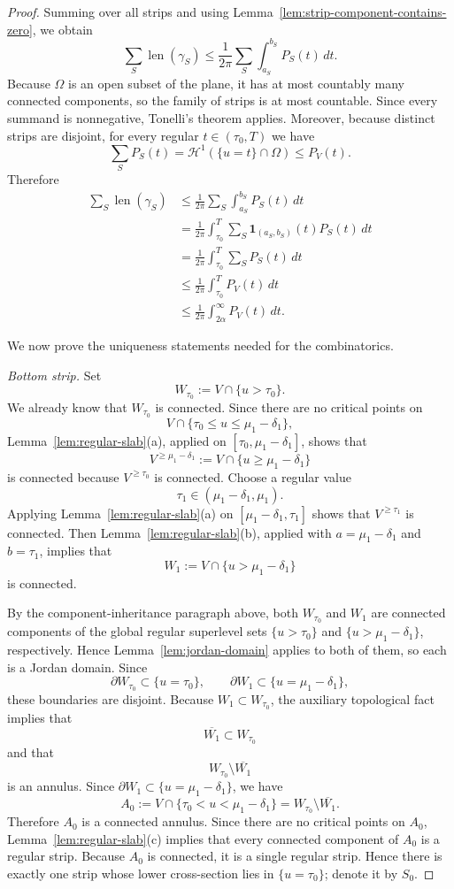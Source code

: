 \documentclass[12pt]{amsart}
\theoremstyle{definition}
\theoremstyle{remark}
\begin{document}
\begin{proof}
\indent Summing over all strips and using Lemma~\ref{lem:strip-component-contains-zero}, we obtain
\[
\sum_S \operatorname{len}(\gamma_S)\le \frac{1}{2\pi}\sum_S\int_{a_S}^{b_S} P_S(t)\,dt.
\]
Because $\Omega$ is an open subset of the plane, it has at most countably many connected components, so the family of strips is at most countable. Since every summand is nonnegative, Tonelli's theorem applies. Moreover, because distinct strips are disjoint, for every regular $t\in(\tau_0,T)$ we have
\[
\sum_S P_S(t)=\mathcal H^1(\{u=t\}\cap\Omega)\le P_V(t).
\]
Therefore
\begin{align}
\sum_S \operatorname{len}(\gamma_S)
&\le \frac{1}{2\pi}\sum_S\int_{a_S}^{b_S} P_S(t)\,dt \\
&= \frac{1}{2\pi}\int_{\tau_0}^{T}\sum_S \mathbf 1_{(a_S,b_S)}(t)P_S(t)\,dt \\
&= \frac{1}{2\pi}\int_{\tau_0}^{T}\sum_S P_S(t)\,dt \\
&\le \frac{1}{2\pi}\int_{\tau_0}^{T} P_V(t)\,dt \\
&\le \frac{1}{2\pi}\int_{2\alpha}^{\infty} P_V(t)\,dt.
\tag{11}
\end{align}

We now prove the uniqueness statements needed for the combinatorics.

\smallskip
\noindent\emph{Bottom strip.}
Set
\[
W_{\tau_0}:=V\cap\{u>\tau_0\}.
\]
We already know that $W_{\tau_0}$ is connected. Since there are no critical points on
\[
V\cap\{\tau_0\le u\le \mu_1-\delta_1\},
\]
Lemma~\ref{lem:regular-slab}(a), applied on $[\tau_0,\mu_1-\delta_1]$, shows that
\[
V^{\ge \mu_1-\delta_1}:=V\cap\{u\ge \mu_1-\delta_1\}
\]
is connected because $V^{\ge \tau_0}$ is connected. Choose a regular value
\[
\tau_1\in(\mu_1-\delta_1,\mu_1).
\]
Applying Lemma~\ref{lem:regular-slab}(a) on $[\mu_1-\delta_1,\tau_1]$ shows that
$V^{\ge \tau_1}$ is connected. Then Lemma~\ref{lem:regular-slab}(b), applied with
$a=\mu_1-\delta_1$ and $b=\tau_1$, implies that
\[
W_1:=V\cap\{u>\mu_1-\delta_1\}
\]
is connected.

By the component-inheritance paragraph above, both $W_{\tau_0}$ and $W_1$ are connected
components of the global regular superlevel sets $\{u>\tau_0\}$ and $\{u>\mu_1-\delta_1\}$,
respectively. Hence Lemma~\ref{lem:jordan-domain} applies to both of them, so each is a Jordan domain. Since
\[
\partial W_{\tau_0}\subset \{u=\tau_0\},
\qquad
\partial W_1\subset \{u=\mu_1-\delta_1\},
\]
these boundaries are disjoint. Because $W_1\subset W_{\tau_0}$, the auxiliary topological fact implies that
\[
\overline{W_1}\subset W_{\tau_0}
\]
and that
\[
W_{\tau_0}\setminus \overline{W_1}
\]
is an annulus. Since $\partial W_1\subset \{u=\mu_1-\delta_1\}$, we have
\[
A_0:=V\cap\{\tau_0<u<\mu_1-\delta_1\}=W_{\tau_0}\setminus \overline{W_1}.
\]
Therefore $A_0$ is a connected annulus. Since there are no critical points on $A_0$, Lemma~\ref{lem:regular-slab}(c) implies that every connected component of $A_0$ is a regular strip. Because $A_0$ is connected, it is a single regular strip. Hence there is exactly one strip whose lower cross-section lies in $\{u=\tau_0\}$; denote it by $S_0$.


\end{proof}
\end{document}
